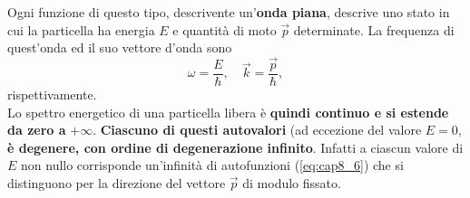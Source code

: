 \documentclass[a4paper,12pt,oneside]{book}
\begin{document}
Ogni funzione di questo tipo, descrivente un'\textbf{onda piana}, descrive uno stato in cui la particella ha energia $E$ e quantità di moto $\vec{p}$ determinate. La frequenza di quest'onda ed il suo vettore d'onda sono
\begin{equation}
\omega = \frac{E}{\hbar}, \quad \vec{k}= \frac{\vec{p}}{\hbar},
\end{equation}
rispettivamente.\\
Lo spettro energetico di una particella libera è \textbf{quindi continuo e si estende da zero a} $+\infty$. \textbf{Ciascuno di questi autovalori} (ad eccezione del valore $E=0$, \textbf{è degenere, con ordine di degenerazione infinito}. Infatti a ciascun valore di $E$ non nullo corrisponde un'infinità di autofunzioni (\ref{eq:cap8_6}) che si distinguono per la direzione del vettore $\vec{p}$ di modulo fissato.
\end{document}
